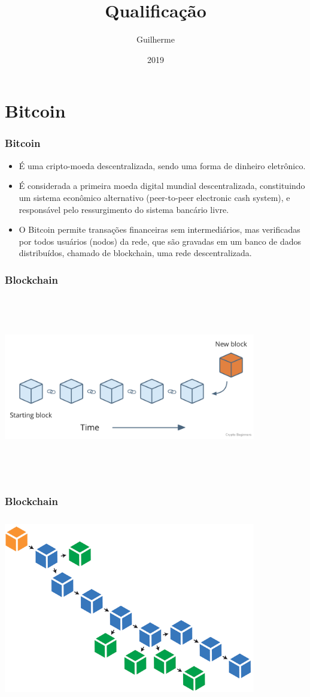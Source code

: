 \documentclass{beamer}
\title{Qualificação}
\author{Guilherme}
\institute{FGV}
\date{2019}
\begin{document}
 
\frame{\titlepage}

\section{Bitcoin}

\begin{frame}
\frametitle{Bitcoin}
\begin{itemize}
    \item É uma cripto-moeda descentralizada, sendo uma forma de dinheiro eletrônico.
    \item É considerada a primeira moeda digital mundial descentralizada, constituindo um sistema econômico alternativo (peer-to-peer electronic cash system), e responsável pelo ressurgimento do sistema bancário livre.
    \item O Bitcoin permite transações financeiras sem intermediários, mas verificadas por todos usuários (nodos) da rede, que são gravadas em um banco de dados distribuídos, chamado de blockchain, uma rede descentralizada.
\end{itemize}
\end{frame}

\begin{frame}
\frametitle{Blockchain}
\includegraphics[width=11cm, height=8cm]{blockchain1}
\end{frame}

\begin{frame}
\frametitle{Blockchain}
\includegraphics[width=11cm, height=8cm]{blockchain2}
\end{frame}
\end{document}

